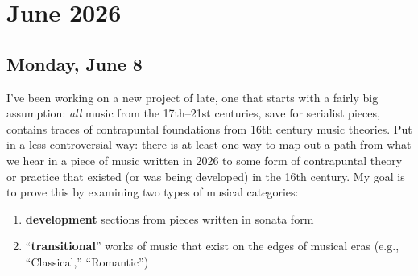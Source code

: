 \documentclass[12pt,a4paper]{article}
\begin{document}
\section*{June 2026}

\subsection*{Monday, June 8}

I've been working on a new project of late, one that starts with a fairly big assumption: \textit{all} music from the 17th--21st centuries, save for serialist pieces, contains traces of contrapuntal foundations from 16th century music theories. Put in a less controversial way: there is at least one way to map out a path from what we hear in a piece of music written in 2026 to some form of contrapuntal theory or practice that existed (or was being developed) in the 16th century. My goal is to prove this by examining two types of musical categories: 

\begin{enumerate}
	\item \textbf{development} sections from pieces written in sonata form
	\item \enquote{\textbf{transitional}} works of music that exist on the edges of musical eras (e.g., \enquote{Classical,} \enquote{Romantic})
\end{enumerate}
\end{document}
